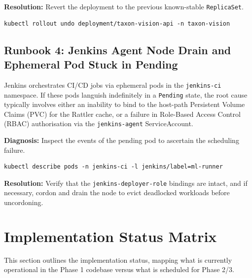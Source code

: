 \textbf{Resolution:} Revert the deployment to the previous known-stable \texttt{ReplicaSet}.
\begin{verbatim}
kubectl rollout undo deployment/taxon-vision-api -n taxon-vision
\end{verbatim}

\subsection{Runbook 4: Jenkins Agent Node Drain and Ephemeral Pod Stuck in Pending}
Jenkins orchestrates CI/CD jobs via ephemeral pods in the \texttt{jenkins-ci} namespace. If these pods languish indefinitely in a \texttt{Pending} state, the root cause typically involves either an inability to bind to the host-path Persistent Volume Claims (PVC) for the Rattler cache, or a failure in Role-Based Access Control (RBAC) authorisation via the \texttt{jenkins-agent} ServiceAccount.

\textbf{Diagnosis:} Inspect the events of the pending pod to ascertain the scheduling failure.
\begin{verbatim}
kubectl describe pods -n jenkins-ci -l jenkins/label=ml-runner
\end{verbatim}

\textbf{Resolution:} Verify that the \texttt{jenkins-deployer-role} bindings are intact, and if necessary, cordon and drain the node to evict deadlocked workloads before uncordoning.

\section{Implementation Status Matrix}
\label{sec:implementation_status_matrix}

This section outlines the implementation status, mapping what is currently operational in the Phase 1 codebase versus what is scheduled for Phase 2/3.

